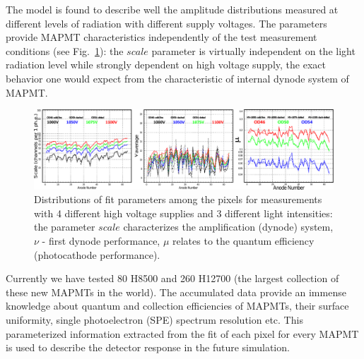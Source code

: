 The model is found to describe well the amplitude distributions measured at different levels of radiation with different supply voltages.
The parameters provide MAPMT characteristics independently of the test measurement conditions (see Fig.~\ref{fig:PavelPassport}): the $scale$ parameter is virtually independent on the light radiation level while strongly dependent on high voltage supply, the exact behavior one would expect from the characteristic of internal dynode system of MAPMT.

\begin{figure}[t]
	\centering
	\includegraphics[width=\linewidth]{figures/PavelPassport.pdf}
	\caption{Distributions of fit parameters among the pixels for measurements with 4 different high voltage supplies and 3 different light intensities: the parameter $scale$ characterizes the amplification (dynode) system, $\nu$ - first dynode performance, $\mu$ relates to the quantum efficiency (photocathode performance).}
	\label{fig:PavelPassport}
\end{figure}

Currently we have tested 80 H8500 and 260 H12700 (the largest collection of these new MAPMTs in the world).
The accumulated data provide an immense knowledge about quantum and collection efficiencies of MAPMTs, their surface uniformity, single photoelectron (SPE) spectrum resolution etc.
This parameterized information extracted from the fit of each pixel for every MAPMT is used to describe the detector response in the future simulation.

